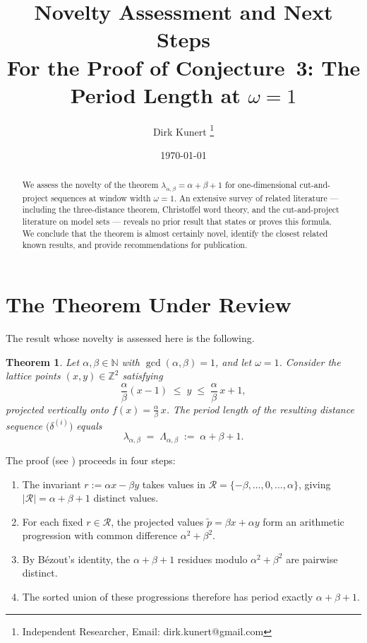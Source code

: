 \documentclass[11pt]{article}
\title{Novelty Assessment and Next Steps\\
\large For the Proof of Conjecture~3: The Period Length at $\omega = 1$}
\author{Dirk Kunert \thanks{Independent Researcher, Email: dirk.kunert@gmail.com}}
\date{\today}
\theoremstyle{plain}
\newtheorem{theorem}{Theorem}
\theoremstyle{remark}
\begin{document}
\maketitle

\begin{abstract}
We assess the novelty of the theorem $\lambda_{\alpha,\beta} = \alpha + \beta + 1$ for
one-dimensional cut-and-project sequences at window width $\omega = 1$.
An extensive survey of related literature --- including the three-distance theorem,
Christoffel word theory, and the cut-and-project literature on model sets ---
reveals no prior result that states or proves this formula.
We conclude that the theorem is almost certainly novel, identify the closest related
known results, and provide recommendations for publication.
\end{abstract}

\section{The Theorem Under Review}

The result whose novelty is assessed here is the following.

\begin{theorem}
Let $\alpha, \beta \in \mathbb{N}$ with $\gcd(\alpha, \beta) = 1$, and let $\omega = 1$.
Consider the lattice points $(x, y) \in \mathbb{Z}^2$ satisfying
\[
    \frac{\alpha}{\beta}(x - 1) \;\le\; y \;\le\; \frac{\alpha}{\beta}\,x + 1,
\]
projected vertically onto $f(x) = \tfrac{\alpha}{\beta}\,x$.
The period length of the resulting distance sequence $\bigl(\delta^{(i)}\bigr)$ equals
\[
    \lambda_{\alpha,\beta} \;=\; \Lambda_{\alpha,\beta} \;:=\; \alpha + \beta + 1.
\]
\end{theorem}

The proof (see \cite{Kunert2025proof}) proceeds in four steps:
\begin{enumerate}
    \item The invariant $r := \alpha x - \beta y$ takes values in
          $\mathcal{R} = \{-\beta, \ldots, 0, \ldots, \alpha\}$,
          giving $|\mathcal{R}| = \alpha + \beta + 1$ distinct values.
    \item For each fixed $r \in \mathcal{R}$, the projected values
          $\tilde{p} = \beta x + \alpha y$ form an arithmetic progression with
          common difference $\alpha^2 + \beta^2$.
    \item By B\'{e}zout's identity, the $\alpha + \beta + 1$ residues modulo
          $\alpha^2 + \beta^2$ are pairwise distinct.
    \item The sorted union of these progressions therefore has period exactly
          $\alpha + \beta + 1$.
\end{enumerate}
\end{document}
